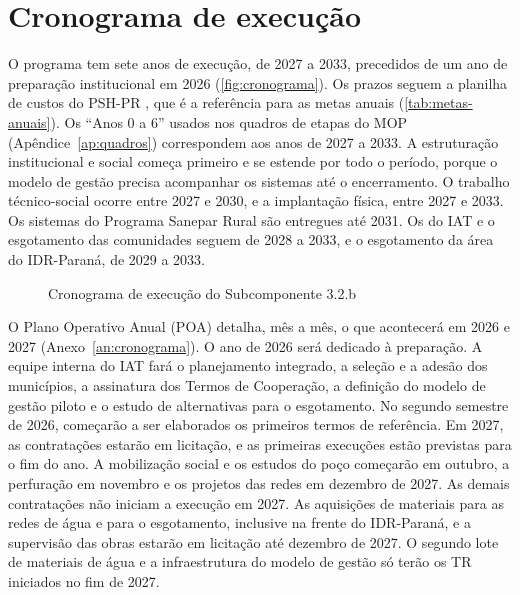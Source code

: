 \section{Cronograma de execução}
\label{sec:cronograma}

O programa tem sete anos de execução, de 2027 a 2033, precedidos de um ano
de preparação institucional em 2026 (\autoref{fig:cronograma}). Os prazos
seguem a planilha de custos do PSH-PR \cite{custo2026}, que é a referência
para as metas anuais (\autoref{tab:metas-anuais}). Os ``Anos 0 a 6'' usados
nos quadros de etapas do MOP (Apêndice~\ref{ap:quadros}) correspondem aos
anos de 2027 a 2033. A estruturação institucional e social começa primeiro e
se estende por todo o período, porque o modelo de gestão precisa acompanhar os
sistemas até o encerramento. O trabalho técnico-social ocorre entre 2027 e
2030, e a implantação física, entre 2027 e 2033. Os sistemas do Programa
Sanepar Rural são entregues até 2031. Os do IAT e o esgotamento das
comunidades seguem de 2028 a 2033, e o esgotamento da área do IDR-Paraná, de
2029 a 2033.

\begin{figure}[htbp]
  \centering
  \caption{Cronograma de execução do Subcomponente 3.2.b}
  \label{fig:cronograma}
  
\end{figure}

O Plano Operativo Anual (POA) detalha, mês a mês, o que acontecerá em 2026 e
2027 (Anexo~\ref{an:cronograma}). O ano de 2026 será dedicado à preparação.
A equipe interna do IAT fará o planejamento integrado, a seleção e a adesão
dos municípios, a assinatura dos Termos de Cooperação, a definição do modelo
de gestão piloto e o estudo de alternativas para o esgotamento. No segundo
semestre de 2026, começarão a ser elaborados os primeiros termos de
referência. Em 2027, as contratações estarão em licitação, e as primeiras
execuções estão previstas para o fim do ano. A mobilização social e os
estudos do poço começarão em outubro, a perfuração em novembro e os projetos
das redes em dezembro de 2027. As demais contratações não iniciam a execução em
2027. As aquisições de materiais para as redes de água e para o esgotamento,
inclusive na frente do IDR-Paraná, e a supervisão das obras estarão em
licitação até dezembro de 2027. O segundo lote de materiais de água e a
infraestrutura do modelo de gestão só terão os TR iniciados no fim de 2027.


